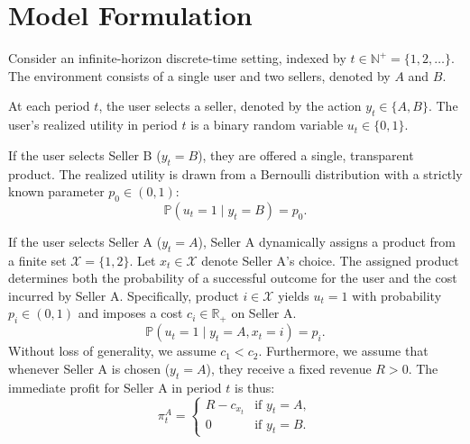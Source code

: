 \documentclass[opre]{informs3} %
\begin{document}







\ABSTRACT{}



\maketitle

\section{Model Formulation}

Consider an infinite-horizon discrete-time setting, indexed by $t \in \mathbb{N}^+ = \{1, 2, \dots\}$. The environment consists of a single user and two sellers, denoted by $A$ and $B$. 

At each period $t$, the user selects a seller, denoted by the action $y_t \in \{A, B\}$. The user's realized utility in period $t$ is a binary random variable $u_t \in \{0, 1\}$. 

If the user selects Seller B ($y_t = B$), they are offered a single, transparent product. The realized utility is drawn from a Bernoulli distribution with a strictly known parameter $p_0 \in (0, 1)$:
\begin{equation}
    \mathbb{P}(u_t = 1 \mid y_t = B) = p_0.
\end{equation}

If the user selects Seller A ($y_t = A$), Seller A dynamically assigns a product from a finite set $\mathcal{X} = \{1, 2\}$. Let $x_t \in \mathcal{X}$ denote Seller A's choice. The assigned product determines both the probability of a successful outcome for the user and the cost incurred by Seller A. Specifically, product $i \in \mathcal{X}$ yields $u_t = 1$ with probability $p_i \in (0, 1)$ and imposes a cost $c_i \in \mathbb{R}_+$ on Seller A. 
\begin{equation}
    \mathbb{P}(u_t = 1 \mid y_t = A, x_t = i) = p_i.
\end{equation}
Without loss of generality, we assume $c_1 < c_2$. Furthermore, we assume that whenever Seller A is chosen ($y_t = A$), they receive a fixed revenue $R > 0$. The immediate profit for Seller A in period $t$ is thus:
\begin{equation}
    \pi_t^A = 
    \begin{cases} 
      R - c_{x_t} & \text{if } y_t = A, \\
      0 & \text{if } y_t = B.
    \end{cases}
\end{equation}
\end{document}
